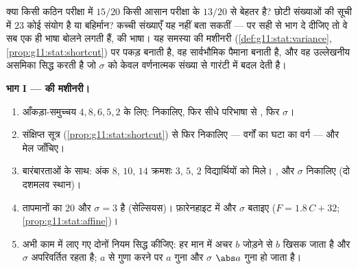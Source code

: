\begin{problem}
\label{pb:g11:stat:1}
क्या किसी कठिन परीक्षा में $15/20$ किसी आसान परीक्षा के $13/20$ से बेहतर है?
छोटी संख्याओं की सूची में $23$ कोई संयोग है या बहिर्मान? कच्ची संख्याएँ यह
नहीं बता सकतीं --- पर सही  से भाग दे दीजिए तो वे सब एक ही भाषा
बोलने लगती हैं, \emph{} की भाषा। यह समस्या  की मशीनरी (\cref{def:g11:stat:variance},
\cref{prop:g11:stat:shortcut}) पर पकड़ बनाती है, वह सार्वभौमिक पैमाना बनाती है, और वह उल्लेखनीय
असमिका सिद्ध करती है जो $\sigma$ को केवल वर्णनात्मक संख्या से गारंटी में बदल
देती है।

\medskip
\noindent\textbf{भाग I ---  की मशीनरी।}
\begin{enumerate}
  \item आँकड़ा-समुच्चय $4, 8, 6, 5, 2$ के लिए:  निकालिए, फिर सीधे परिभाषा से
        , फिर $\sigma$।
  \item संक्षिप्त सूत्र (\cref{prop:g11:stat:shortcut}) से  फिर निकालिए --- वर्गों का 
        घटा  का वर्ग --- और मेल जाँचिए।
  \item बारंबारताओं के साथ: अंक $8$, $10$, $14$ क्रमशः $3$, $5$,
        $2$ विद्यार्थियों को मिले। ,  और $\sigma$ निकालिए (दो
        दशमलव स्थान)।
  \item तापमानों का  $20$ और $\sigma = 3$ है (सेल्सियस)। फ़ारेनहाइट में
         और $\sigma$ बताइए ($F = 1.8\,C + 32$; \cref{prop:g11:stat:affine})।
  \item अभी काम में लाए गए दोनों नियम सिद्ध कीजिए: हर मान में अचर $b$
        जोड़ने से  $b$ खिसक जाता है और $\sigma$ अपरिवर्तित रहता है;
        $a$ से गुणा करने पर  $a$ गुना और $\sigma$ $\abs a$ गुना हो
        जाता है।
\end{enumerate}


\end{problem}
